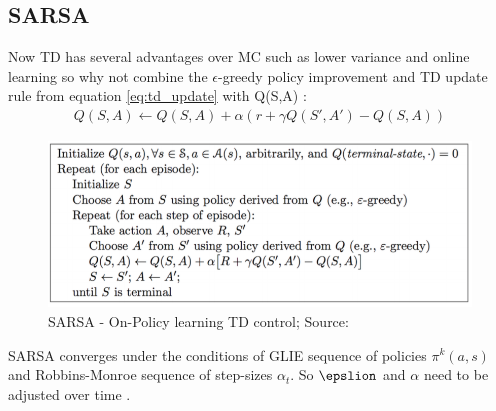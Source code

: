 

\subsection{SARSA}
Now TD has several advantages over MC such as lower variance and online learning so why not combine the $\epsilon$-greedy policy improvement and TD update rule from equation \ref{eq:td_update} with Q(S,A) \cite{lecture_mfc} :
\begin{align}
    Q(S, A) \longleftarrow Q(S, A) + \alpha (r + \gamma Q(S', A') - Q(S, A)) \label{eq:sarsa_update_rule}
\end{align}

\begin{figure}[h!]
  \centering
  \includegraphics[scale=0.5]{figures/sarsa.PNG}
  \caption{SARSA - On-Policy learning TD control; Source: \cite{lecture_mfc}}
  \label{fig:sarsa}
\end{figure}

SARSA converges under the conditions of GLIE sequence of policies $\pi^k(a, s)$ and Robbins-Monroe sequence of step-sizes $\alpha_t$. So $\epslion$ and $\alpha$ need to be adjusted over time \cite{lecture_mfc}.

